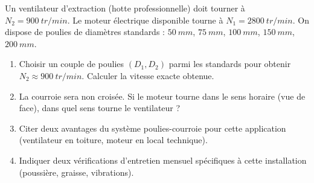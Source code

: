 \documentclass[11pt]{article}
\begin{document}
\begin{exercice}
Un ventilateur d'extraction (hotte professionnelle) doit tourner à $N_2 = \SI{900}{tr/min}$. Le moteur électrique disponible tourne à $N_1 = \SI{2800}{tr/min}$. On dispose de poulies de diamètres standards : $\SI{50}{mm}$, $\SI{75}{mm}$, $\SI{100}{mm}$, $\SI{150}{mm}$, $\SI{200}{mm}$.
\begin{enumerate}
\item Choisir un couple de poulies $(D_1, D_2)$ parmi les standards pour obtenir $N_2 \approx \SI{900}{tr/min}$. Calculer la vitesse exacte obtenue.
\item La courroie sera non croisée. Si le moteur tourne dans le sens horaire (vue de face), dans quel sens tourne le ventilateur ?
\item Citer deux avantages du système poulies-courroie pour cette application (ventilateur en toiture, moteur en local technique).
\item Indiquer deux vérifications d'entretien mensuel spécifiques à cette installation (poussière, graisse, vibrations).
\end{enumerate}
\end{exercice}
\end{document}
